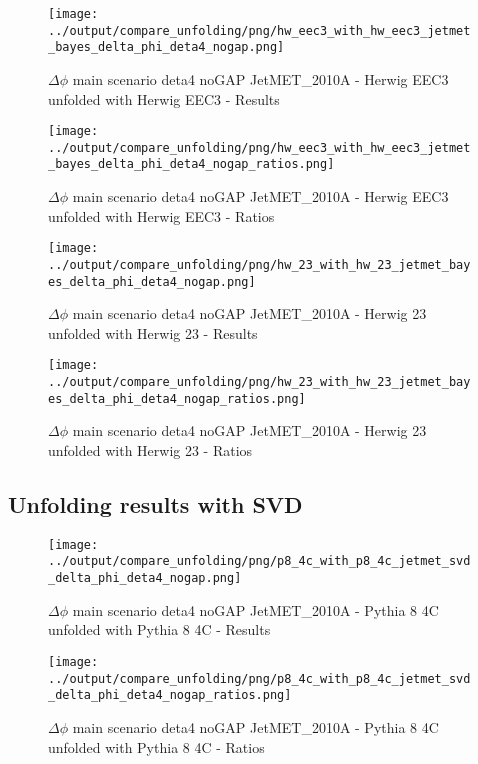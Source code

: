\documentclass[11pt]{book}
\begin{document}
\begin{figure}[ht]
\centering
\texttt{[image: ../output/compare\_unfolding/png/hw\_eec3\_with\_hw\_eec3\_jetmet\_bayes\_delta\_phi\_deta4\_nogap.png]}
\caption{$\Delta\phi$ main scenario deta4 noGAP JetMET\_2010A - Herwig EEC3 unfolded with Herwig EEC3 - Results}
\label{hw_eec3_hw_eec3_jetmet_bayes_delta_phi_deta4_nogap_a}
\end{figure}

\begin{figure}[ht]
\centering
\texttt{[image: ../output/compare\_unfolding/png/hw\_eec3\_with\_hw\_eec3\_jetmet\_bayes\_delta\_phi\_deta4\_nogap\_ratios.png]}
\caption{$\Delta\phi$ main scenario deta4 noGAP JetMET\_2010A - Herwig EEC3 unfolded with Herwig EEC3 - Ratios}
\label{hw_eec3_hw_eec3_jetmet_bayes_delta_phi_deta4_nogap_b}
\end{figure}

\begin{figure}[ht]
\centering
\texttt{[image: ../output/compare\_unfolding/png/hw\_23\_with\_hw\_23\_jetmet\_bayes\_delta\_phi\_deta4\_nogap.png]}
\caption{$\Delta\phi$ main scenario deta4 noGAP JetMET\_2010A - Herwig 23 unfolded with Herwig 23 - Results}
\label{hw_23_hw_23_jetmet_bayes_delta_phi_deta4_nogap_a}
\end{figure}

\begin{figure}[ht]
\centering
\texttt{[image: ../output/compare\_unfolding/png/hw\_23\_with\_hw\_23\_jetmet\_bayes\_delta\_phi\_deta4\_nogap\_ratios.png]}
\caption{$\Delta\phi$ main scenario deta4 noGAP JetMET\_2010A - Herwig 23 unfolded with Herwig 23 - Ratios}
\label{hw_23_hw_23_jetmet_bayes_delta_phi_deta4_nogap_b}
\end{figure}


\clearpage
\subsection{Unfolding results with SVD}

\begin{figure}[ht]
\centering
\texttt{[image: ../output/compare\_unfolding/png/p8\_4c\_with\_p8\_4c\_jetmet\_svd\_delta\_phi\_deta4\_nogap.png]}
\caption{$\Delta\phi$ main scenario deta4 noGAP JetMET\_2010A - Pythia 8 4C unfolded with Pythia 8 4C - Results}
\label{p8_p8_jetmet_svd_delta_phi_deta4_nogap_a}
\end{figure}

\begin{figure}[ht]
\centering
\texttt{[image: ../output/compare\_unfolding/png/p8\_4c\_with\_p8\_4c\_jetmet\_svd\_delta\_phi\_deta4\_nogap\_ratios.png]}
\caption{$\Delta\phi$ main scenario deta4 noGAP JetMET\_2010A - Pythia 8 4C unfolded with Pythia 8 4C - Ratios}
\label{p8_p8_jetmet_svd_delta_phi_deta4_nogap_b}
\end{figure}
\end{document}
